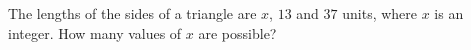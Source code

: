 The lengths of the sides of a triangle are $x$, $13$ and $37$ units, where $x$ is an integer. How many values of $x$ are possible?
